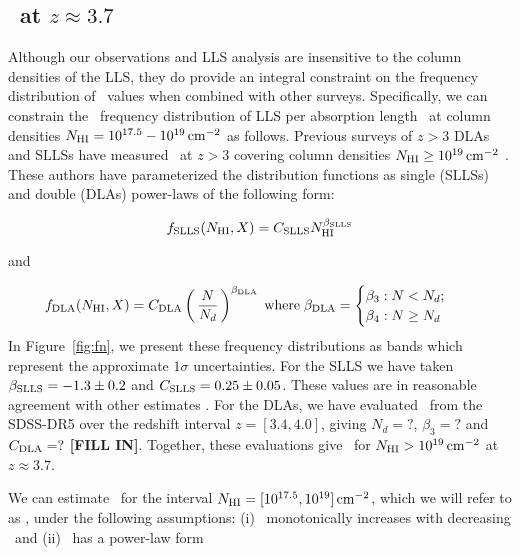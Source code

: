 \documentclass[12pt,preprint]{aastex}
\begin{document}
\subsection{\lfnhi\ at $z \approx 3.7$}

Although our observations and LLS analysis are insensitive
to the  column densities of the LLS, 
they do provide an integral
constraint on the frequency distribution of \nhi\ values
when combined with other surveys.
Specifically, we can constrain the
\nhi\ frequency distribution of LLS per absorption length
\lfnhi\ at column densities
$N_{\rm HI} = 10^{17.5} - 10^{19} \, {\rm cm^{-2}}$ as follows.
Previous surveys of $z>3$ DLAs and SLLSs 
have measured \fnhi\ at $z>3$ covering column densities 
$N_{\rm HI} \ge 10^{19} \, {\rm cm^{-2}}$ \citep{phw05,opb+07,pw09}.
These authors have parameterized the
distribution functions as single (SLLSs) and double (DLAs) power-laws
of the following form:

\begin{equation}
f_{\rm SLLS}(N_{\rm HI},X) = C_{\rm SLLS} N_{\rm HI}^{\beta_{\rm SLLS}} 
\label{eqn:fslls}
\end{equation}

and

\begin{equation}
f_{\rm DLA}(N_{\rm HI},X) = C_{\rm DLA} \left ( \, \frac{N}{N_d} \, \right )^{\beta_{\rm DLA}}
  \; {\rm where} \; \beta_{\rm DLA} =  
\begin{cases}
\beta_3:  N < N_d ; \quad \\ 
\beta_4:  N \geq N_d \\
\end{cases}
\label{eqn:fdla}
\end{equation}
In Figure~\ref{fig:fn}, we present these frequency distributions
as bands which represent the approximate $1 \sigma$ uncertainties.
For the SLLS we have taken $\beta_{\rm SLLS} = -1.3 \pm 0.2$ and
$C_{\rm SLLS} = 0.25 \pm 0.05$.
These values are in reasonable agreement with other estimates
\citep{petitjean}.
For the DLAs, we have evaluated \fnhi\ from the SDSS-DR5 \citep{pw09}
over the redshift interval $z=[3.4,4.0]$, giving 
$N_d = ?$, $\beta_3 = ?$ and $C_{\rm DLA} = ?$ {\bf [FILL IN]}.
Together, these evaluations give \fnhi\ for $N_{\rm HI}> 10^{19} \, {\rm cm^{-2}}$
at $z \approx 3.7$.

We can estimate \fnhi\ for the interval $N_{\rm HI} = [10^{17.5}, 10^{19}]\, {\rm cm^{-2}}$,
which we will refer to as \lfnhi,
under the following assumptions:
(i) \lfnhi\ monotonically increases with decreasing \nhi\ 
and
(ii) \lfnhi\ has a power-law form 
\end{document}
